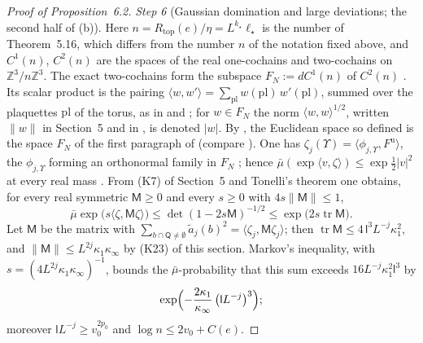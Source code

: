\documentclass[11pt]{amsart}
\theoremstyle{definition}
\begin{document}
\begin{proof}[Proof of Proposition~6.2]
\emph{Step 6} (Gaussian domination and large deviations; the second half of (b)).
Here $n=R_{\mathrm{top}}(e)/\eta=L^{k_\star}\ell_\star$ is the number of Theorem~5.16, which differs from the number $n$ of the notation fixed above, and $C^1(n)$, $C^2(n)$ are the spaces of the real one-cochains and two-cochains on $\mathbb Z^3/n\mathbb Z^3$.
The exact two-cochains form the subspace $F_N:=dC^1(n)$ of $C^2(n)$ \cite[Sections~I.7.1, I.7.3]{QEDIII}.
Its scalar product is the pairing $\langle w,\allowbreak w'\rangle=\allowbreak \sum_{\mathrm{pl}}w(\mathrm{pl})\,\allowbreak w'(\mathrm{pl})$, summed over the plaquettes $\mathrm{pl}$ of the torus, as in \cite[Definition~2.6]{QEDII} and \cite[Section~I.7.1]{QEDIII};
for $w\in F_N$ the norm $\langle w,w\rangle^{1/2}$, written $\|w\|$ in Section~5 and in \cite[Section~I.7.1]{QEDIII}, is denoted $|w|$.
By \cite[Chapter~29, P1, (Q7.4)]{QEDIII}, the Euclidean space so defined is the space $F_N$ of the first paragraph of \cite[Section~14.5.2]{QEDI} (compare \cite[Section~5.2.1]{QEDI}).
One has $\zeta_j(\Upsilon)=\langle\phi_{j,\Upsilon},F^{\mathrm u}\rangle$, the $\phi_{j,\Upsilon}$ forming an orthonormal family in $F_N$ \cite[Theorem~14.17\,(c)]{QEDI};
hence $\bar\mu(\exp\langle v,\zeta\rangle)\le\exp\frac12|v|^2$ at every real mass \cite[Proposition~31.1\,(d)]{QEDIII}.
From (K7) of Section~5 and Tonelli's theorem one obtains, for every real symmetric $\mathsf M\ge0$ and every $s\ge0$ with $4s\|\mathsf M\|\le1$,
\begin{equation*}
\bar\mu\exp\bigl(s\langle\zeta,\mathsf M\zeta\rangle\bigr)\le\det(1-2s\mathsf M)^{-1/2}\le\exp\bigl(2s\operatorname{tr}\mathsf M\bigr).
\end{equation*}
Let $\mathsf M$ be the matrix with $\sum_{b\cap\mathsf Q\ne\emptyset}\tilde a_j(b)^2=\allowbreak \langle\zeta_j,\allowbreak \mathsf M\zeta_j\rangle$;
then $\operatorname{tr}\mathsf M\le4\,\mathsf l^3L^{-j}\kappa_1^2$, and $\|\mathsf M\|\le L^{2j}\kappa_1\kappa_\infty$ by (K23) of this section.
Markov's inequality, with $s=(4L^{2j}\kappa_1\kappa_\infty)^{-1}$, bounds the $\bar\mu$-probability that this sum exceeds $16L^{-j}\kappa_1^2\mathsf l^3$ by
\begin{equation*}
\exp\Bigl(-\frac{2\kappa_1}{\kappa_\infty}\,\bigl(\mathsf lL^{-j}\bigr)^3\Bigr);
\end{equation*}
moreover $\mathsf lL^{-j}\ge v_0^{2p_0}$ and $\log n\le2v_0+C(e)$.


\end{proof}
\end{document}
